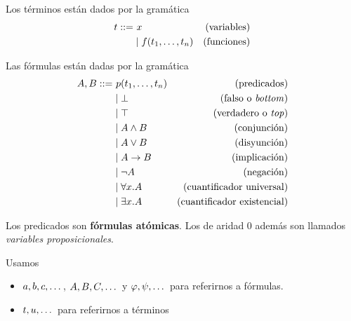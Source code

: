 \begin{definition}[Términos]
    Los términos están dados por la gramática
    \begin{align*}
        \term ::= &\ \var                               &\text{(variables)} \\
                  & \mid \fun(\term_1, \dots, \term_n) &\text{(funciones)}
    \end{align*}
\end{definition}

\begin{definition}[Fórmulas]
    Las fórmulas están dadas por la gramática
    \begin{align*}
        A, B ::=
         & \ p(t_1, \dots, t_n) & (\text{predicados})                \\
         & \mid \bot                     & \text{(falso o \textit{bottom})}         \\
         & \mid \top                      & \text{(verdadero o \textit{top})} \\
         & \mid A \wedge B        & \text{(conjunción)}                \\
         & \mid A \vee B         & \text{(disyunción)}                \\
         & \mid A \to B        & \text{(implicación)}               \\
         & \mid \neg A                 & \text{(negación)}                  \\
         & \mid \forall x . A        & \text{(cuantificador universal)}   \\
         & \mid \exists x . A        & \text{(cuantificador existencial)}
    \end{align*}

    Los predicados son \textbf{fórmulas atómicas}. Los de aridad 0 además son llamados \textit{variables proposicionales}.
\end{definition}

\begin{notation*}
    Usamos
    \begin{itemize}
        \item $a, b, c, \dots$, $A, B, C, \dots$ y $\varphi, \psi, \dots$ para referirnos a fórmulas.
        \item $t, u, \dots$ para referirnos a términos
    \end{itemize}
\end{notation*}

